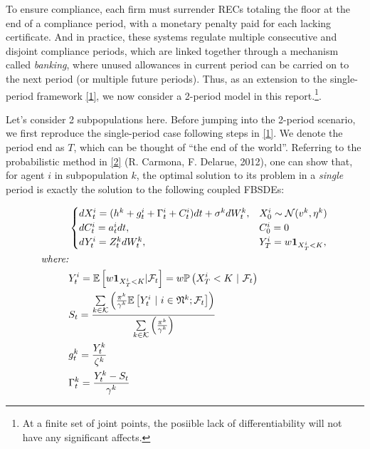\documentclass{article}
\begin{document}
To ensure compliance, each firm must surrender RECs totaling the floor
at the end of a compliance period, with a monetary penalty paid for each
lacking certificate. And in practice, these systems regulate multiple
consecutive and disjoint compliance periods, which are linked together
through a mechanism called \emph{banking}, where unused allowances in
current period can be carried on to the next period (or multiple future
periods). Thus, as an extension to the single-period framework
\href{\%22https://doi.org/10.48550/arXiv.2110.01127\%22}{{[}1{]}}, we
now consider a 2-period model in this report.\footnote{At a finite set
  of joint points, the posiible lack of differentiability will not have
  any significant affects.}.

\hypertarget{
\subsection{REC Market Modeling with
FBSDEs}
}{\label{rec-market-modeling}}


Let's consider 2 subpopulations here. Before jumping into the 2-period
scenario, we first reproduce the single-period case following steps in
\href{\%22https://doi.org/10.48550/arXiv.2110.01127\%22}{{[}1{]}}. We
denote the period end as \(T\), which can be thought of ``the end of the
world''. Referring to the probabilistic method in
\href{https://arxiv.org/abs/1210.5780}{{[}2{]}} (R. Carmona, F. Delarue,
2012), one can show that, for agent \(i\) in subpopulation \(k\), the
optimal solution to its problem in a \emph{single} period is exactly the
solution to the following coupled FBSDEs:

\begin{alignat}{2}
    &\begin{cases}
        dX_t^{i} = (h^{k} + g_t^{i} + \Gamma_t^{i} + C_t^{i})dt + \sigma^{k}dW_t^{k},  &X_0^{i} \sim \mathcal{N}(v^k,\eta^k) \notag \\
        dC_t^{i} = a_t^{i}dt, &C_0^{i}=0 \notag \\
        dY_t^{i} = Z_t^{k}dW_t^{k}, &Y_{T}^{i} = w\mathbf{1}_{X_{T}^i<K}, \notag \\
    \end{cases}\\
    \textit{where:}&\\
        &Y_t^i = \mathbb{E} \left[w\mathbf{1}_{X_{T}^i< K}|\mathcal{F}_t \right] = w\mathbb{P}\left(X_{T}^i< K ~|~ \mathcal {F}_t\right) \notag \\
        &S_t = \frac{\sum\limits_{k \in \mathcal{K}} {\left(\frac{\pi^k}{\gamma^k}\mathbb{E}\left[ Y_t^i ~|~ i \in \mathfrak{N}^k; \mathcal{F}_t \right]\right)} }{\sum\limits_{k \in \mathcal{K}}{\left(\frac{\pi^k}{\gamma^k}\right)}} \notag \\
        &g_t^k = \frac{Y_t^k}{\zeta^k} \notag \\
        &\Gamma_t^{k} = \frac{Y_t^{k}-S_t}{\gamma^{k}} 
\end{alignat}
\end{document}
